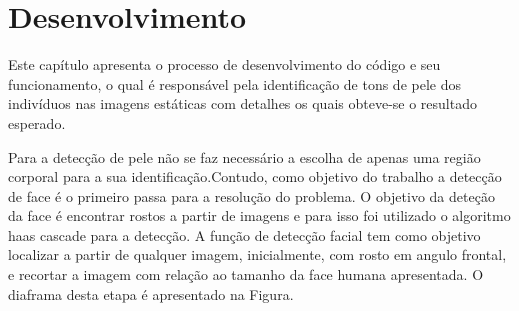 \chapter{Desenvolvimento}
\label{cap:desenvolvimento}

Este capítulo apresenta o processo de desenvolvimento do código e seu funcionamento, o qual é responsável pela identificação de tons de pele dos indivíduos nas imagens estáticas com detalhes os quais obteve-se o resultado esperado. 

Para a detecção de pele não se faz necessário a escolha de apenas uma região corporal para a sua identificação.Contudo, como objetivo do trabalho a detecção de face é o primeiro passa para a resolução do problema. O objetivo da deteção da face é encontrar rostos a partir de imagens e para isso foi utilizado o algoritmo haas cascade para a detecção.
A função de detecção facial tem como objetivo localizar a partir de qualquer imagem, inicialmente, com rosto em angulo frontal, e recortar a imagem com relação ao tamanho da face humana apresentada. O diaframa desta etapa é apresentado na Figura.


